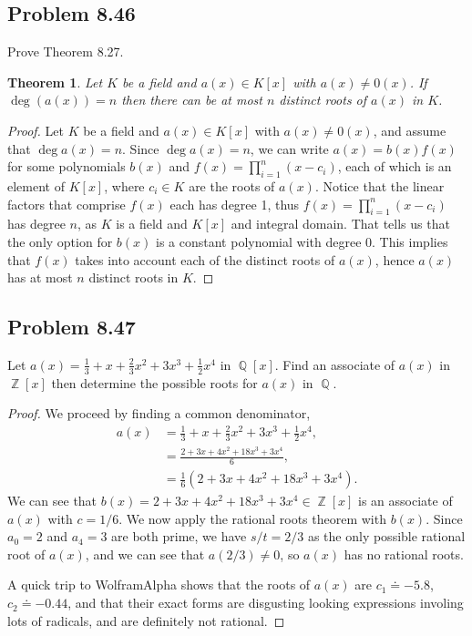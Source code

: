 \documentclass[letterpaper, 12pt]{amsart}
\DeclareMathOperator{\Z}{\mathbb{Z}}
\DeclareMathOperator{\Q}{\mathbb{Q}}
\newtheorem{thm}{Theorem}
\begin{document}
	\subsection*{Problem 8.46}
	\label{sub:probem_8_46}
	Prove Theorem 8.27.
	\setcounter{thm}{26}
		\begin{thm}
		Let $K$ be a field and $a(x) \in K[x]$ with $a(x) \neq 0(x)$. 
		If $\deg(a(x)) = n$ then there can be at most $n$ distinct roots of $a(x)$ in $K$.
		\end{thm}

		\begin{proof}
		Let $K$ be a field and $a(x) \in K[x]$ with $a(x) \neq 0(x)$, and assume that $\deg{a(x)} = n$.
		Since $\deg{a(x)} = n$, we can write $a(x) = b(x)f(x)$ for some polynomials $b(x)$ and $f(x) = \prod_{i=1}^{n} (x-c_{i})$, each of which is an element of $K[x]$, where $c_{i} \in K$ are the roots of $a(x)$.
		Notice that the linear factors that comprise $f(x)$ each has degree 1, thus $f(x) = \prod_{i=1}^{n} (x-c_{i})$ has degree $n$, as $K$ is a field and $K[x]$ and integral domain.
		That tells us that the only option for $b(x)$ is a constant polynomial with degree 0.
		This implies that $f(x)$ takes into account each of the distinct roots of $a(x)$, hence $a(x)$ has at most $n$ distinct roots in $K$.
		\end{proof}

	\subsection*{Problem 8.47}
	\label{sub:probem_8_47}
	Let $a(x) = \frac{1}{3} + x + \frac{2}{3}x^{2} + 3x^{3} + \frac{1}{2}x^{4}$ in $\Q[x]$.
	Find an associate of $a(x)$ in $\Z[x]$ then determine the possible roots for $a(x)$ in $\Q$.
		\begin{proof}
		We proceed by finding a common denominator,
		\begin{align*}
		a(x) &= \frac{1}{3} + x + \frac{2}{3}x^{2} + 3x^{3} + \frac{1}{2}x^{4}, \\
		&= \frac{2 + 3x + 4x^{2} + 18x^{3} + 3x^{4}}{6}, \\
		&= \frac{1}{6} \left( 2 + 3x + 4x^{2} + 18x^{3} + 3x^{4} \right).
		\end{align*}
		We can see that $b(x) = 2 + 3x + 4x^{2} + 18x^{3} + 3x^{4} \in \Z[x]$ is an associate of $a(x)$ with $c = 1/6$.
		We now apply the rational roots theorem with $b(x)$.
		Since $a_{0} = 2$ and $a_{4} = 3$ are both prime, we have $s/t = 2/3$ as the only possible rational root of $a(x)$, and we can see that $a(2/3) \neq 0$, so $a(x)$ has no rational roots.

		A quick trip to WolframAlpha shows that the roots of $a(x)$ are $c_{1} \doteq -5.8$, $c_{2} \doteq -0.44$, and that their exact forms are disgusting looking expressions involing lots of radicals, and are definitely not rational.
		\end{proof}
\end{document}
